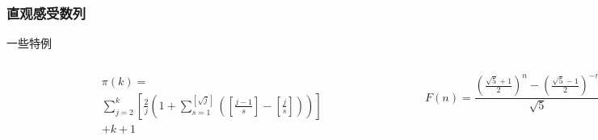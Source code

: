 \documentclass[
10pt, 
aspectratio=43, 
]{beamer}
\begin{document}
\subsubsection{直观感受数列}
\begin{frame}{一些特例}
\begin{columns}
         \begin{figure}
            \centering
            \includegraphics[width=0.8\linewidth]{prime.png}

        \end{figure}
\begin{equation*}
\begin{aligned}
& \pi(k)= \\
& \sum_{j=2}^k\left[\frac{2}{j}\left(1+\sum_{s=1}^{[\sqrt{j}]}\left(\left[\frac{j-1}{s}\right]-\left[\frac{j}{s}\right]\right)\right)\right] \\
& +k+1
\end{aligned}
\end{equation*}
	\small
        \begin{figure}
            \centering
            \includegraphics[width=0.8\linewidth]{fibonacci.png}
        \end{figure}
        \begin{equation*}
        F(n) = \frac{{(\frac{\sqrt{5}+1}{2})^n - (\frac{\sqrt{5}-1}{2})^{-n}}}{{\sqrt{5}}}.
        \end{equation*}
\end{columns}
\end{frame}
\end{document}
